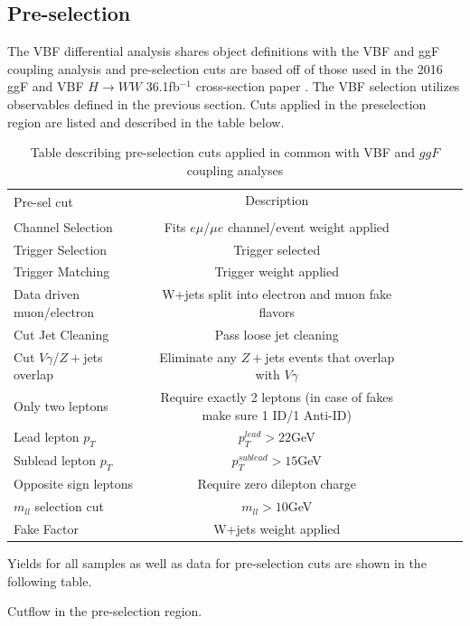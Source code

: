 \subsection{Pre-selection}
The VBF differential analysis shares object definitions with the VBF and ggF coupling analysis and pre-selection cuts are based off of those used in the 2016 ggF and VBF $H\rightarrow WW$ 36.1fb$^{-1}$ cross-section paper \cite{Aaboud_2019}. The VBF selection utilizes observables defined in the previous section. Cuts applied in the preselection region are listed and described in the table below. 
\begin{table}[h!]
\centering
\small{
\begin{tabular}{|l|c|c|c|c|c|}
\hline
\multirow{2}{*}{Pre-sel cut}   & Description \\
				&	 \\
\hline
Channel Selection	& Fits $e\mu$/$\mu e$ channel/event weight applied\\  
Trigger Selection	&  Trigger selected \\
Trigger Matching	&  Trigger weight applied  \\
Data driven muon/electron & W+jets split into electron and muon fake flavors \\
Cut Jet Cleaning	& Pass loose jet cleaning \\
Cut $V\gamma$/$Z+$jets overlap & Eliminate any $Z+$jets events that overlap with $V\gamma$ \\ 
Only two leptons       	&  Require exactly 2 leptons (in case of fakes make sure 1 ID/1 Anti-ID) \\
Lead lepton $p_T$	& $p_T^{lead} > 22 $GeV \\
Sublead lepton $p_T$	& $p_T^{sublead} >15 $GeV \\
Opposite sign leptons	&  Require zero dilepton charge \\
$m_{ll}$ selection cut	&  $m_{ll} > 10$GeV \\
Fake Factor	& W+jets weight applied \\
\hline
\end{tabular}
\caption{Table describing pre-selection cuts applied in common with VBF and $ggF$ coupling analyses}
\label{tab:preseldef}
}
\end{table}

Yields for all samples as well as data for pre-selection cuts are shown in the following table.
\begin{table}[h!]
\scalebox{.3}{

}
\caption{Cutflow in the pre-selection region.}
\label{tab:preselcut}
\end{table}

